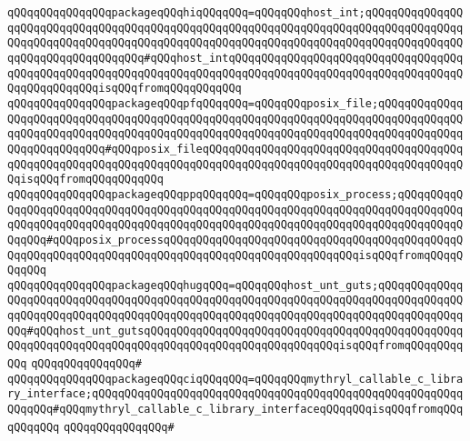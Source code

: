 \verb|qQQqqQQqqQQqqQQqpackageqQQqhiqQQqqQQq=qQQqqQQqhost_int;qQQqqQQqqQQqqQQqqQQqqQQqqQQqqQQqqQQqqQQqqQQqqQQqqQQqqQQqqQQqqQQqqQQqqQQqqQQqqQQqqQQqqQQqqQQqqQQqqQQqqQQqqQQqqQQqqQQqqQQqqQQqqQQqqQQqqQQqqQQqqQQqqQQqqQQqqQQqqQQqqQQqqQQqqQQqqQQq#qQQqhost_intqQQqqQQqqQQqqQQqqQQqqQQqqQQqqQQqqQQqqQQqqQQqqQQqqQQqqQQqqQQqqQQqqQQqqQQqqQQqqQQqqQQqqQQqqQQqqQQqqQQqqQQqqQQqqQQqqQQqqQQqisqQQqfromqQQqqQQqqQQq|\newline
\verb|qQQqqQQqqQQqqQQqpackageqQQqpfqQQqqQQq=qQQqqQQqposix_file;qQQqqQQqqQQqqQQqqQQqqQQqqQQqqQQqqQQqqQQqqQQqqQQqqQQqqQQqqQQqqQQqqQQqqQQqqQQqqQQqqQQqqQQqqQQqqQQqqQQqqQQqqQQqqQQqqQQqqQQqqQQqqQQqqQQqqQQqqQQqqQQqqQQqqQQqqQQqqQQqqQQqqQQq#qQQqposix_fileqQQqqQQqqQQqqQQqqQQqqQQqqQQqqQQqqQQqqQQqqQQqqQQqqQQqqQQqqQQqqQQqqQQqqQQqqQQqqQQqqQQqqQQqqQQqqQQqqQQqqQQqqQQqqQQqisqQQqfromqQQqqQQqqQQq|\newline
\verb|qQQqqQQqqQQqqQQqpackageqQQqppqQQqqQQq=qQQqqQQqposix_process;qQQqqQQqqQQqqQQqqQQqqQQqqQQqqQQqqQQqqQQqqQQqqQQqqQQqqQQqqQQqqQQqqQQqqQQqqQQqqQQqqQQqqQQqqQQqqQQqqQQqqQQqqQQqqQQqqQQqqQQqqQQqqQQqqQQqqQQqqQQqqQQqqQQqqQQqqQQq#qQQqposix_processqQQqqQQqqQQqqQQqqQQqqQQqqQQqqQQqqQQqqQQqqQQqqQQqqQQqqQQqqQQqqQQqqQQqqQQqqQQqqQQqqQQqqQQqqQQqqQQqqQQqisqQQqfromqQQqqQQqqQQq|\newline
\verb|qQQqqQQqqQQqqQQqpackageqQQqhugqQQq=qQQqqQQqhost_unt_guts;qQQqqQQqqQQqqQQqqQQqqQQqqQQqqQQqqQQqqQQqqQQqqQQqqQQqqQQqqQQqqQQqqQQqqQQqqQQqqQQqqQQqqQQqqQQqqQQqqQQqqQQqqQQqqQQqqQQqqQQqqQQqqQQqqQQqqQQqqQQqqQQqqQQqqQQqqQQq#qQQqhost_unt_gutsqQQqqQQqqQQqqQQqqQQqqQQqqQQqqQQqqQQqqQQqqQQqqQQqqQQqqQQqqQQqqQQqqQQqqQQqqQQqqQQqqQQqqQQqqQQqqQQqqQQqisqQQqfromqQQqqQQqqQQq|\newline
\verb|qQQqqQQqqQQqqQQq#|\newline
\verb|qQQqqQQqqQQqqQQqpackageqQQqciqQQqqQQq=qQQqqQQqmythryl_callable_c_library_interface;qQQqqQQqqQQqqQQqqQQqqQQqqQQqqQQqqQQqqQQqqQQqqQQqqQQqqQQqqQQqqQQq#qQQqmythryl_callable_c_library_interfaceqQQqqQQqisqQQqfromqQQqqQQqqQQq|\newline
\verb|qQQqqQQqqQQqqQQq#|\newline

